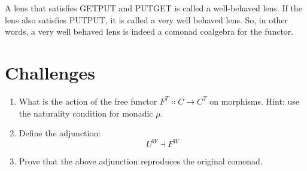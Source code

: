A lens that satisfies GETPUT and PUTGET is called a well-behaved lens.
If the lens also satisfies PUTPUT, it is called a very well behaved lens.
So, in other words, a very well behaved lens is indeed a comonad coalgebra for
the  functor.

\section{Challenges}

\begin{enumerate}
	\tightlist
	\item
	      What is the action of the free functor
	      $F^T \Colon C \to C^T$ on morphisms. Hint: use the
	      naturality condition for monadic $\mu$.
	\item
	      Define the adjunction:
	      \[U^W \dashv F^W\]
	\item
	      Prove that the above adjunction reproduces the original comonad.
\end{enumerate}
